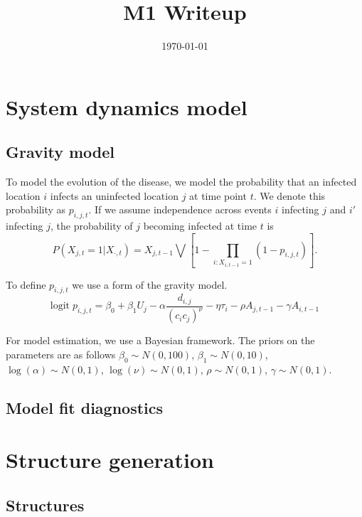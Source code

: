 \documentclass[11pt]{article}
\date{\today}
\title{M1 Writeup}
\newcommand{\logit}{\text{logit}}
\begin{document}
\maketitle
\tableofcontents


\section{System dynamics model}
\label{sec-1}

\subsection{Gravity model}
\label{sec-1-1}

To model the evolution of the disease, we model the probability that
an infected location $i$ infects an uninfected location $j$ at time
point $t$.  We denote this probability as $p_{i,j,t}$.  If we assume
independence across events $i$ infecting $j$ and $i'$ infecting $j$,
the probability of $j$ becoming infected at time $t$ is
\begin{equation*}
  P(X_{j,t} = 1 | X_{\cdot,t}) = X_{j,t-1} \bigvee \left[1 - \prod_{i:
  X_{i,t-1} = 1} ( 1 - p_{i,j,t} ) \right].
\end{equation*}

To define $p_{i,j,t}$ we use a form of the gravity model.
\begin{equation*}
  \logit \; p_{i,j,t} = \beta_0 + \beta_1 U_j 
  - \alpha \frac{d_{i,j}}{(c_ic_j)^\nu} - \eta \tau_i 
  - \rho A_{j,t-1} - \gamma A_{i,t-1}
\end{equation*}

For model estimation, we use a Bayesian framework.  The priors on the
parameters are as follows $\beta_0 \sim N(0,100)$, $\beta_1 \sim
N(0,10)$, $\log(\alpha) \sim N(0,1)$, $\log(\nu) \sim N(0,1)$, $\rho
\sim N(0,1)$, $\gamma \sim N(0,1)$.


\subsection{Model fit diagnostics}
\label{sec-1-2}

\section{Structure generation}
\label{sec-2}

\subsection{Structures}
\label{sec-2-1}
\end{document}
